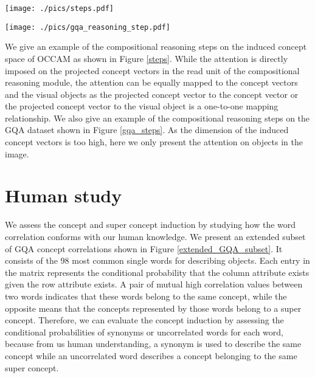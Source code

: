 \documentclass[10pt,twocolumn,letterpaper]{article}
\begin{document}
\begin{figure*}
\centering
\texttt{[image: ./pics/steps.pdf]}
\caption{Visualization of reasoning steps on CLEVR dataset. (a) The question, image, prediction and ground truth answer. The index of each object is shown on the upper left of the object. (b) The induced concepts of objects and relations. (c) The stepwise attentions on question words. (d) The stepwise attentions on objects. (e) The concept vector read into the memory of the reasoning module in each step.}
\label{steps}
\end{figure*}

\begin{figure*}
\centering
\texttt{[image: ./pics/gqa\_reasoning\_step.pdf]}
\caption{Visualization of reasoning steps on GQA dataset. }
\label{gqa_steps}
\end{figure*}

We give an example of the compositional reasoning steps on the induced concept space of OCCAM as shown in Figure \ref{steps}. While the attention is directly imposed on the projected concept vectors in the read unit of the compositional reasoning module, the attention can be equally mapped to the concept vectors and the visual objects as the projected concept vector to the concept vector or the projected concept vector to the visual object is a one-to-one mapping relationship. We also give an example of the compositional reasoning steps on the GQA dataset shown in Figure \ref{gqa_steps}. As the dimension of the induced concept vectors is too high, here we only present the attention on objects in the image.

\section{Human study}
\label{app:human_study}
We assess the concept and super concept induction by studying how the word correlation conforms with our human knowledge. We present an extended subset of GQA concept correlations shown in Figure \ref{extended_GQA_subset}. It consists of the 98 most common single words for describing objects. Each entry in the matrix represents the conditional probability that the column attribute exists given the row attribute exists. A pair of mutual high correlation values between two words indicates that these words belong to the same concept, while the opposite means that the concepts represented by those words belong to a super concept. Therefore, we can evaluate the concept induction by assessing the conditional probabilities of synonyms or uncorrelated words for each word, because from us human understanding, a synonym is used to describe the same concept while an uncorrelated word describes a concept belonging to the same super concept. 
\end{document}

